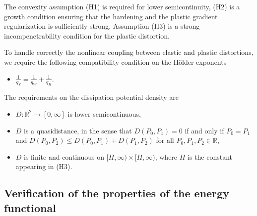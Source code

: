 \documentclass[a4paper,10pt,oneside]{amsbook}
\numberwithin{section}{chapter}
\numberwithin{equation}{chapter}
\theoremstyle{definition}
\begin{document}
The convexity assumption (H1) is required for lower semicontinuity, (H2) is a growth condition ensuring that the hardening and the plastic gradient regularization is sufficiently strong. Assumption (H3) is a strong incompenetrability condition for the plastic distortion.

To handle correctly the nonlinear coupling between elastic and plastic distortions, we require the following compatibility condition on the H\"older exponents
\begin{itemize}
\item[(\"O)] $\frac{1}{q_Y}=\frac{1}{q_W}+\frac{1}{q_H}$.
\end{itemize}

The requirements on the dissipation potential density are
\begin{itemize}[itemsep=1em]
\item[(D1)] $D\colon\mathbb{R}^2\to[0,\infty]$ is lower semicontinuous,
\item[(D2)] $D$ is a quasidistance, in the sense that $D(P_0,P_1)=0$ if and only if $P_0=P_1$ and $D(P_0,P_2)\le D(P_0,P_1)+D(P_1,P_2)$ for all $P_0,P_1,P_2\in\mathbb{R}$,
\item[(D2)] $D$ is finite and continuous on $[\Pi,\infty)\times[\Pi,\infty)$, where $\Pi$ is the constant appearing in (H3).
\end{itemize}

\subsection{Verification of the properties of the energy functional}
\end{document}

